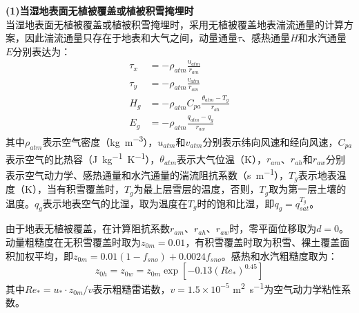\textbf {(1)当湿地表面无植被覆盖或植被积雪掩埋时}\\

当湿地表面无植被覆盖或植被积雪掩埋时，采用无植被覆盖地表湍流通量的计算方案，因此湍流通量只存在于地表和大气之间，动量通量$\tau$、感热通量$H$和水汽通量$E$分别表达为：
\begin{align}
    \tau_x &= -\rho_{atm} \frac{u_{atm}}{r_{am}} \\
    \tau_y &= -\rho_{atm} \frac{v_{atm}}{r_{am}} \\
    H_g &= -\rho_{atm} C_{pa} \frac{\theta_{atm}-T_g}{r_{ah}} \\
    E_g &= -\rho_{atm} \frac{q_{atm}-q_g}{r_{aw}}
\end{align}
其中$\rho_{atm}$表示空气密度（\unit{kg.m^{-3}}），$u_{atm}$和$v_{atm}$分别表示纬向风速和经向风速，$C_{pa}$表示空气的比热容（\unit{J.kg^{-1}.K^{-1}}），$\theta_{atm}$表示大气位温（K），$r_{am}$、$r_{ah}$和$r_{aw}$分别表示空气动力学、感热通量和水汽通量的湍流阻抗系数（\unit{s.m^{-1}}），$T_g$表示地表温度（K），当有积雪覆盖时，$T_g$为最上层雪层的温度，否则，$T_g$取为第一层土壤的温度。$q_g$表示地表空气的比湿，取为温度在$T_g$时的饱和比湿，即$q_g=q^{T_g}_{sat}$。 

由于地表无植被覆盖，在计算阻抗系数$r_{am}$、$r_{ah}$、$r_{aw}$时，零平面位移取为$d=0$。动量粗糙度在无积雪覆盖时取为$z_{0m}=0.01$，有积雪覆盖时取为积雪、裸土覆盖面积加权平均，即$z_{0m}=0.01 \left(1-f_{sno}\right)+0.0024 f_{sno}$。感热和水汽粗糙度取为：
\begin{equation}
    z_{0h}=z_{0w}=z_{0m}\exp{\left[-0.13\left(Re_*\right)^{0.45}\right]}
\end{equation}
其中$Re_*=u_*\cdot z_{0m}/v$表示粗糙雷诺数，$v= 1.5 \times 10^{-5}$ \unit{m^2.s^{-1}}为空气动力学粘性系数。

